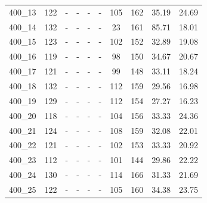 \documentclass[a4paper,final]{article}
\begin{document}
\begin{longtable}[c]{cccccccccc}
400\_13 & 122 & -  & -   & -     & -     & 105 & 162 & 35.19 & 24.69 \\
400\_14 & 132 & -  & -   & -     & -     & 23  & 161 & 85.71 & 18.01 \\
400\_15 & 123 & -  & -   & -     & -     & 102 & 152 & 32.89 & 19.08 \\
400\_16 & 119 & -  & -   & -     & -     & 98  & 150 & 34.67 & 20.67 \\
400\_17 & 121 & -  & -   & -     & -     & 99  & 148 & 33.11 & 18.24 \\
400\_18 & 132 & -  & -   & -     & -     & 112 & 159 & 29.56 & 16.98 \\
400\_19 & 129 & -  & -   & -     & -     & 112 & 154 & 27.27 & 16.23 \\
400\_20 & 118 & -  & -   & -     & -     & 104 & 156 & 33.33 & 24.36 \\
400\_21 & 124 & -  & -   & -     & -     & 108 & 159 & 32.08 & 22.01 \\
400\_22 & 121 & -  & -   & -     & -     & 102 & 153 & 33.33 & 20.92 \\
400\_23 & 112 & -  & -   & -     & -     & 101 & 144 & 29.86 & 22.22 \\
400\_24 & 130 & -  & -   & -     & -     & 114 & 166 & 31.33 & 21.69 \\
400\_25 & 122 & -  & -   & -     & -     & 105 & 160 & 34.38 & 23.75
\end{longtable}
\end{document}
